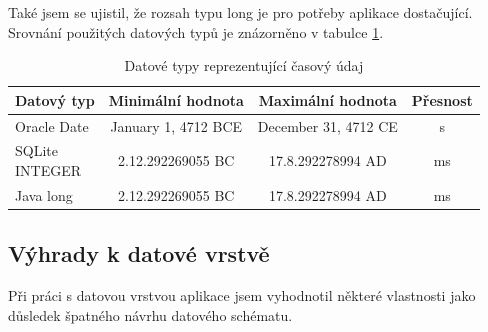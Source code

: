 \documentclass{diplomka}
\begin{document}
Také jsem se ujistil, že rozsah typu long je pro potřeby aplikace dostačující. Srovnání použitých datových typů je znázorněno v tabulce \ref{tab:cas}. 

\begin{table}[H]
\centering
\begin{tabular}{| p{2.5cm} | c | c | c |}
\hline
Datový typ &  Minimální hodnota & Maximální hodnota & Přesnost \\ \hline
Oracle Date &   January 1, 4712 BCE  &  December 31, 4712 CE &  s \\ \hline
\parbox[c][1cm][c]{5cm}{SQLite\\ INTEGER} &  2.12.292269055 BC  & 17.8.292278994 AD &  ms \\ \hline
Java long & 2.12.292269055 BC   & 17.8.292278994 AD &  ms \\ \hline
\end{tabular}
\caption{Datové typy reprezentující časový údaj}
\label{tab:cas}
\end{table}

\newpage
\subsection{Výhrady k datové vrstvě}
Při práci s datovou vrstvou aplikace jsem vyhodnotil některé vlastnosti jako důsledek špatného návrhu datového schématu.
\end{document}
